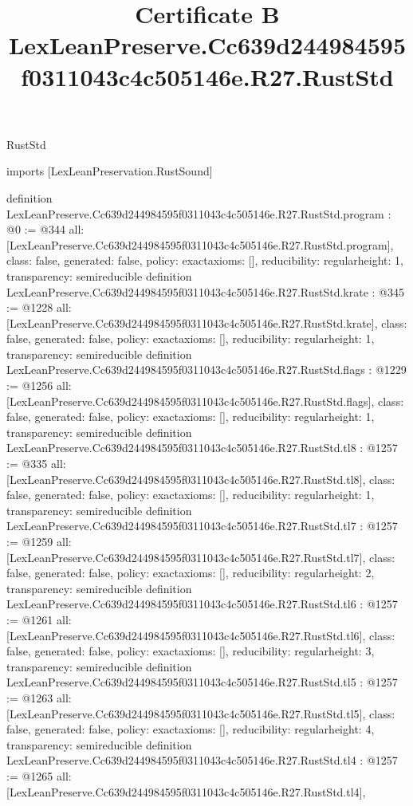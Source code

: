 \begin{lexlean}{RustStd}
\title{Certificate B LexLeanPreserve.Cc639d244984595f0311043c4c505146e.R27.RustStd}
\begin{coremodule}
imports [LexLeanPreservation.RustSound]

definition LexLeanPreserve.Cc639d244984595f0311043c4c505146e.R27.RustStd.program : @0 := @344 {
  all: [LexLeanPreserve.Cc639d244984595f0311043c4c505146e.R27.RustStd.program],
  class: false,
  generated: false,
  policy: exact{axioms: []},
  reducibility: regular{height: 1},
  transparency: semireducible
}
definition LexLeanPreserve.Cc639d244984595f0311043c4c505146e.R27.RustStd.krate : @345 := @1228 {
  all: [LexLeanPreserve.Cc639d244984595f0311043c4c505146e.R27.RustStd.krate],
  class: false,
  generated: false,
  policy: exact{axioms: []},
  reducibility: regular{height: 1},
  transparency: semireducible
}
definition LexLeanPreserve.Cc639d244984595f0311043c4c505146e.R27.RustStd.flags : @1229 := @1256 {
  all: [LexLeanPreserve.Cc639d244984595f0311043c4c505146e.R27.RustStd.flags],
  class: false,
  generated: false,
  policy: exact{axioms: []},
  reducibility: regular{height: 1},
  transparency: semireducible
}
definition LexLeanPreserve.Cc639d244984595f0311043c4c505146e.R27.RustStd.tl8 : @1257 := @335 {
  all: [LexLeanPreserve.Cc639d244984595f0311043c4c505146e.R27.RustStd.tl8],
  class: false,
  generated: false,
  policy: exact{axioms: []},
  reducibility: regular{height: 1},
  transparency: semireducible
}
definition LexLeanPreserve.Cc639d244984595f0311043c4c505146e.R27.RustStd.tl7 : @1257 := @1259 {
  all: [LexLeanPreserve.Cc639d244984595f0311043c4c505146e.R27.RustStd.tl7],
  class: false,
  generated: false,
  policy: exact{axioms: []},
  reducibility: regular{height: 2},
  transparency: semireducible
}
definition LexLeanPreserve.Cc639d244984595f0311043c4c505146e.R27.RustStd.tl6 : @1257 := @1261 {
  all: [LexLeanPreserve.Cc639d244984595f0311043c4c505146e.R27.RustStd.tl6],
  class: false,
  generated: false,
  policy: exact{axioms: []},
  reducibility: regular{height: 3},
  transparency: semireducible
}
definition LexLeanPreserve.Cc639d244984595f0311043c4c505146e.R27.RustStd.tl5 : @1257 := @1263 {
  all: [LexLeanPreserve.Cc639d244984595f0311043c4c505146e.R27.RustStd.tl5],
  class: false,
  generated: false,
  policy: exact{axioms: []},
  reducibility: regular{height: 4},
  transparency: semireducible
}
definition LexLeanPreserve.Cc639d244984595f0311043c4c505146e.R27.RustStd.tl4 : @1257 := @1265 {
  all: [LexLeanPreserve.Cc639d244984595f0311043c4c505146e.R27.RustStd.tl4],
}
\end{coremodule}
\end{lexlean}
